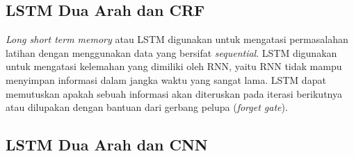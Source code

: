 \subsection{LSTM Dua Arah dan CRF}

\textit{Long short term memory} atau LSTM digunakan untuk mengatasi permasalahan latihan dengan menggunakan data yang bersifat \textit{sequential}. LSTM digunakan untuk mengatasi kelemahan yang dimiliki oleh RNN, yaitu RNN tidak mampu menyimpan informasi dalam jangka waktu yang sangat lama. LSTM dapat memutuskan apakah sebuah informasi akan diteruskan pada iterasi berikutnya atau dilupakan dengan bantuan dari gerbang pelupa (\textit{forget gate}).

\subsection{LSTM Dua Arah dan CNN}


